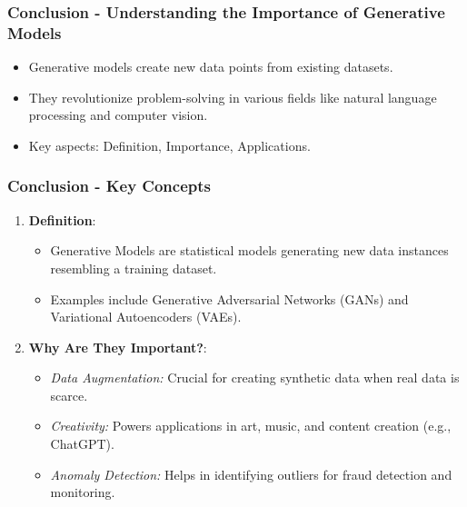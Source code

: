 \documentclass[aspectratio=169]{beamer}
\begin{document}
\begin{frame}[fragile]
    \frametitle{Conclusion - Understanding the Importance of Generative Models}
    \begin{itemize}
        \item Generative models create new data points from existing datasets.
        \item They revolutionize problem-solving in various fields like natural language processing and computer vision.
        \item Key aspects: Definition, Importance, Applications.
    \end{itemize}
\end{frame}

\begin{frame}[fragile]
    \frametitle{Conclusion - Key Concepts}
    \begin{enumerate}
        \item \textbf{Definition}:
            \begin{itemize}
                \item Generative Models are statistical models generating new data instances resembling a training dataset.
                \item Examples include Generative Adversarial Networks (GANs) and Variational Autoencoders (VAEs).
            \end{itemize}
        \item \textbf{Why Are They Important?}:
            \begin{itemize}
                \item \textit{Data Augmentation:} Crucial for creating synthetic data when real data is scarce.
                \item \textit{Creativity:} Powers applications in art, music, and content creation (e.g., ChatGPT).
                \item \textit{Anomaly Detection:} Helps in identifying outliers for fraud detection and monitoring.
            \end{itemize}
    \end{enumerate}
\end{frame}
\end{document}
